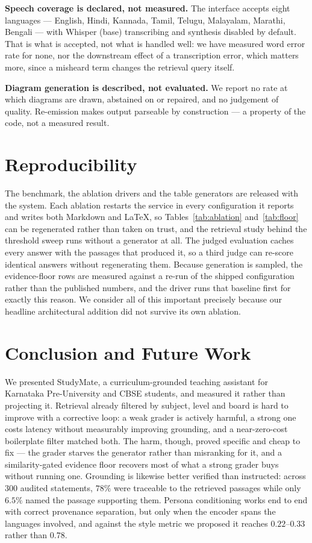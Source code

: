 \documentclass[conference]{IEEEtran}
\begin{document}
\textbf{Speech coverage is declared, not measured.} The interface accepts eight
languages --- English, Hindi, Kannada, Tamil, Telugu, Malayalam, Marathi,
Bengali --- with Whisper (base) transcribing and synthesis disabled by default.
That is what is accepted, not what is handled well: we have measured word error
rate for none, nor the downstream effect of a transcription error, which
matters more, since a misheard term changes the retrieval query itself.

\textbf{Diagram generation is described, not evaluated.} We report no rate at
which diagrams are drawn, abstained on or repaired, and no judgement of
quality. Re-emission makes output parseable by construction --- a property of
the code, not a measured result.

\section{Reproducibility}
The benchmark, the ablation drivers and the table generators are released with
the system. Each ablation restarts the service in every configuration it
reports and writes both Markdown and \LaTeX{}, so Tables~\ref{tab:ablation}
and~\ref{tab:floor} can be regenerated rather than taken on trust, and the
retrieval study behind the threshold sweep runs without a generator at all.
The judged evaluation caches every answer with the passages that produced it,
so a third judge can re-score identical answers without regenerating them.
Because generation is sampled, the evidence-floor rows are measured against a
re-run of the shipped configuration rather than the published numbers, and the
driver runs that baseline first for exactly this reason.
We consider all of this important precisely because our
headline architectural addition did not survive its own ablation.

\section{Conclusion and Future Work}
\label{sec:future}
We presented StudyMate, a curriculum-grounded teaching assistant for Karnataka
Pre-University and CBSE students, and measured it rather than projecting it.
Retrieval already filtered by subject, level and board is hard to improve with
a corrective loop: a weak grader is actively harmful, a strong one costs
latency without measurably improving grounding, and a near-zero-cost
boilerplate filter matched both. The harm, though, proved specific and cheap to
fix --- the grader starves the generator rather than misranking for it, and a
similarity-gated evidence floor recovers most of what a strong grader buys
without running one. Grounding is likewise better verified than instructed:
across $300$ audited statements, $78\%$ were traceable to the retrieved
passages while only $6.5\%$ named the passage supporting them. Persona
conditioning works end to end with correct provenance separation, but only when
the encoder spans the languages involved, and against the style metric we
proposed it reaches $0.22$--$0.33$ rather than $0.78$.
\end{document}
